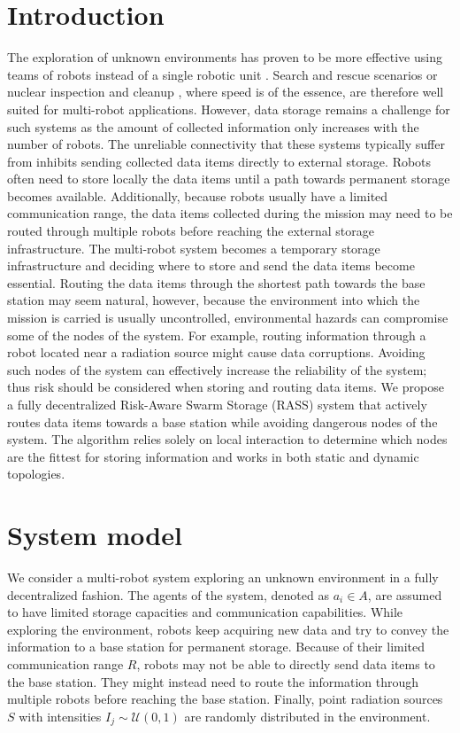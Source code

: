 \section{Introduction}
The exploration of unknown environments has proven to be more effective using teams of robots instead of a single robotic unit \cite{burgard2005coordinated}. Search and rescue scenarios \cite{kantor2003search} or nuclear inspection and cleanup \cite{schwagerMultirobotControlPolicy2017}, where speed is of the essence, are therefore well suited for multi-robot applications. However, data storage remains a challenge for such systems as the amount of collected information only increases with the number of robots. The unreliable connectivity that these systems typically suffer from \cite{amigoni2017multirobot} inhibits sending collected data items directly to external storage. Robots often need to store locally the data items until a path towards permanent storage becomes available. Additionally, because robots usually have a limited communication range, the data items collected during the mission may need to be routed through multiple robots before reaching the external storage infrastructure. The multi-robot system becomes a temporary storage infrastructure and deciding where to store and send the data items become essential. Routing the data items through the shortest path towards the base station may seem natural, however, because the environment into which the mission is carried is usually uncontrolled, environmental hazards can compromise some of the nodes of the system. For example, routing information through a robot located near a radiation source might cause data corruptions. Avoiding such nodes of the system can effectively increase the reliability of the system; thus risk should be considered when storing and routing data items. We propose a fully decentralized Risk-Aware Swarm Storage (RASS) system that actively routes data items towards a base station while avoiding dangerous nodes of the system. The algorithm relies solely on local interaction to determine which nodes are the fittest for storing information and works in both static and dynamic topologies.


\section{System model}
We consider a multi-robot system exploring an unknown environment in a fully decentralized fashion. The agents of the system, denoted as $a_i \in A$, are assumed to have limited storage capacities and communication capabilities. While exploring the environment, robots keep acquiring new data and try to convey the information to a base station for permanent storage. Because of their limited communication range $R$, robots may not be able to directly send data items to the base station. They might instead need to route the information through multiple robots before reaching the base station. Finally, point radiation sources $S$ with intensities $I_j\sim\mathcal{U}(0, 1)$ are randomly distributed in the environment.   

